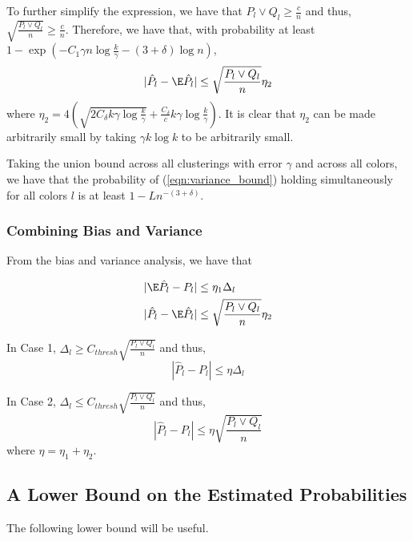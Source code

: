 \documentclass{article}
\begin{document}
To further simplify the expression, we have that $P_l \vee Q_l \geq \frac{c}{n}$ and thus, $\sqrt{ \frac{P_l \vee Q_l}{n} } \geq \frac{c}{n}$. Therefore, we have that, with probability at least $1 - \exp( -C_1 \gamma n \log \frac{k}{\gamma} - (3 + \delta) \log n)$, 
\begin{align}
| \hat{P}_l - \E \hat{P}_l | \leq \sqrt{ \frac{P_l \vee Q_l}{n} } \eta_2 \label{eqn:variance_bound}
\end{align}
where $\eta_2 = 4 \left( \sqrt{2 C_\delta k \gamma \log \frac{k}{\gamma}} 
      + \frac{C_\delta}{c} k \gamma \log \frac{k}{\gamma} \right)$. It is clear that $\eta_2$ can be made arbitrarily small by taking $\gamma k \log k$ to be arbitrarily small. 

 Taking the union bound across all clusterings with error $\gamma$ and across all colors, we have that the probability of (\ref{eqn:variance_bound}) holding simultaneously for all colors $l$ is at least $1 - L n^{-(3+\delta)}$. 

\subsubsection{Combining Bias and Variance}

From the bias and variance analysis, we have that 

\begin{align*}
| \E \hat{P}_l - P_l | &\leq \eta_1 \Delta_l \\
| \hat{P}_l - \E \hat{P}_l | &\leq 
   \sqrt{ \frac{P_l \vee Q_l}{n} } \eta_2
\end{align*}

In Case 1, $\Delta_l \geq C_{thresh} \sqrt{ \frac{P_l \vee Q_l}{n}} $ and thus, 
\[
| \hat{P}_l - P_l| \leq \eta \Delta_l
\]

In Case 2, $\Delta_l \leq C_{thresh} \sqrt{ \frac{P_l \vee Q_l}{n}}$ and thus,
\[
| \hat{P}_l - P_l| \leq \eta \sqrt{ \frac{P_l \vee Q_l}{n}}
\]
where $\eta = \eta_1 + \eta_2$.



\subsection{A Lower Bound on the Estimated Probabilities}

The following lower bound will be useful.
\end{document}
